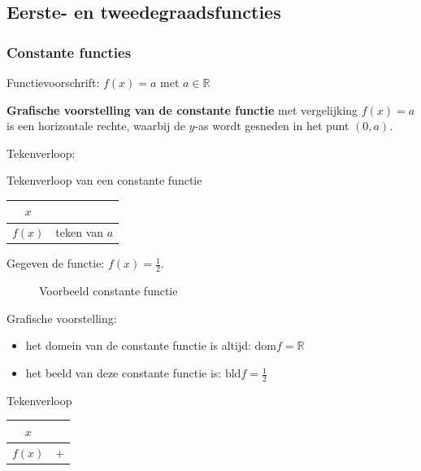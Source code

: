 \subsection{Eerste- en tweedegraadsfuncties}
\label{sec:eerste_tweede}

\subsubsection{Constante functies}

\begin{definitie}
	Functievoorschrift: $f(x)=a$ met $a\in\mathbb{R}$
\end{definitie}


\textbf{Grafische voorstelling van de constante functie}
met vergelijking $f(x)=a$ is een horizontale rechte, waarbij de $y$-as
wordt gesneden in het punt $(0,a)$.


Tekenverloop: 

\begin{tabel}{Tekenverloop van een constante functie}
	\begin{tabular}{c||c}
		$x$ & \\
		\hline 
		$f(x)$ & teken van $a$\\
	\end{tabular}
	\label{tab:ct}
\end{tabel}


\begin{voorbeeld}
	Gegeven de functie: $f(x)=\frac{1}{2}$. 

\begin{figure}[h]
	\centering          
	
	\caption{Voorbeeld constante functie}
	\label{fig:constante_functie}	
\end{figure}
	
 
Grafische voorstelling:
\begin{itemize}
\item het domein van de constante functie is altijd: $\textrm{dom}f=\mathbb{R}$
\item het beeld van deze constante functie is: $\textrm{bld}f=\frac{1}{2}$
\end{itemize}

Tekenverloop

\begin{center}
\begin{tabular}{c||c}
	$x$ & \\
	\hline 
	$f(x)$ & $+$ \\
\end{tabular}	
\end{center}

\end{voorbeeld}

